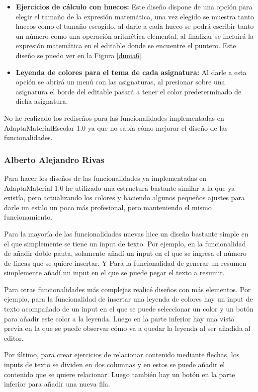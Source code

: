 \begin{itemize}
  \item  \textbf{Ejercicios de cálculo con huecos:} Este diseño dispone de una opción para elegir el tamaño de la expresión matemática, una vez elegido se muestra tanto huecos como el tamaño escogido, al darle a cada hueco se podrá escribir tanto un número como una operación aritmética elemental, al finalizar se incluirá la expresión matemática en el editable donde se encuentre el puntero. Este diseño se puedo ver en la Figura \ref{dunia6}.
  \item  \textbf{Leyenda de colores para el tema de cada asignatura:} Al darle a esta opción se abrirá un menú con las asignaturas, al presionar sobre una asignatura el borde del editable pasará a tener el color predeterminado de dicha asignatura.
\end{itemize}
No he realizado los rediseños para las funcionalidades implementadas en AdaptaMaterialEscolar 1.0  ya que no sabía cómo mejorar el diseño de las funcionalidades.

\subsubsection{Alberto Alejandro Rivas}
Para hacer los diseños de las funcionalidades ya implementadas en AdaptaMaterial 1.0 he utilizado una estructura bastante similar a la que ya existía, pero actualizando los colores y haciendo algunos pequeños ajustes para darle un estilo un poco más profesional, pero manteniendo el mismo funcionamiento.

Para la mayoría de las funcionalidades nuevas hice un diseño bastante simple en el que simplemente se tiene un input de texto. Por ejemplo, en la funcionalidad de añadir doble pauta, solamente añadí un input en el que se ingresa el número de líneas que se quiere insertar. Y Para la funcionalidad de generar un resumen simplemente añadí un input en el que se puede pegar el texto a resumir.

Para otras funcionalidades más complejas realicé diseños con más elementos. Por ejemplo, para la funcionalidad de insertar una leyenda de colores hay un input de texto acompañado de un input en el que se puede seleccionar un color y un botón para añadir este color a la leyenda. Luego en la parte inferior hay una vista previa en la que se puede observar cómo va a quedar la leyenda al ser añadida al editor.

Por último, para crear ejercicios de relacionar contenido mediante flechas, los inputs de texto se dividen en dos columnas y en estos se puede añadir el contenido que se quiere relacionar. Luego también hay un botón en la parte inferior para añadir una nueva fila.


